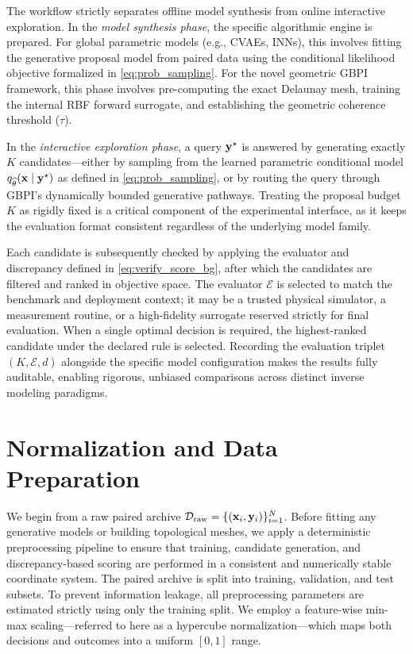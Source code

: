 The workflow strictly separates offline model synthesis from online interactive exploration. In the \textit{model synthesis phase}, the specific algorithmic engine is prepared. For global parametric models (e.g., CVAEs, INNs), this involves fitting the generative proposal model from paired data using the conditional likelihood objective formalized in \eqref{eq:prob_sampling}. For the novel geometric GBPI framework, this phase involves pre-computing the exact Delaunay mesh, training the internal RBF forward surrogate, and establishing the geometric coherence threshold ($\tau$). 

In the \textit{interactive exploration phase}, a query $\mathbf{y}^{\star}$ is answered by generating exactly $K$ candidates—either by sampling from the learned parametric conditional model $q_{\widehat{\theta}}(\mathbf{x}\mid\mathbf{y}^\star)$ as defined in \eqref{eq:prob_sampling}, or by routing the query through GBPI's dynamically bounded generative pathways. Treating the proposal budget $K$ as rigidly fixed is a critical component of the experimental interface, as it keeps the evaluation format consistent regardless of the underlying model family. 

Each candidate is subsequently checked by applying the evaluator and discrepancy defined in \eqref{eq:verify_score_bg}, after which the candidates are filtered and ranked in objective space. The evaluator $\mathcal{E}$ is selected to match the benchmark and deployment context; it may be a trusted physical simulator, a measurement routine, or a high-fidelity surrogate reserved strictly for final evaluation. When a single optimal decision is required, the highest-ranked candidate under the declared rule is selected. Recording the evaluation triplet $(K,\mathcal{E},d)$ alongside the specific model configuration makes the results fully auditable, enabling rigorous, unbiased comparisons across distinct inverse modeling paradigms.

\section{Normalization and Data Preparation}\label{sec:normalization}

We begin from a raw paired archive $\mathcal{D}_{\mathrm{raw}}=\{(\mathbf{x}_i,\mathbf{y}_i)\}_{i=1}^{N}$. Before fitting any generative models or building topological meshes, we apply a deterministic preprocessing pipeline to ensure that training, candidate generation, and discrepancy-based scoring are performed in a consistent and numerically stable coordinate system. The paired archive is split into training, validation, and test subsets. To prevent information leakage, all preprocessing parameters are estimated strictly using only the training split. We employ a feature-wise min-max scaling—referred to here as a hypercube normalization—which maps both decisions and outcomes into a uniform $[0, 1]$ range. 

